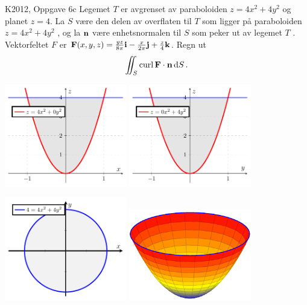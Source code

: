 \begin{frame}
  \begin{oppgave}{K2012, Oppgave 6c}
    Legemet $T$ er avgrenset av paraboloiden $z = 4x^2 +4y^2$ og planet $z = 4$.
    La $S$ være den delen av overflaten til $T$ som ligger på paraboloiden $z =
    4x^2 + 4y^2$ , og la $\mathbf{n}$ være enhetsnormalen til $S$ som peker ut av
    legemet $T$ . Vektorfeltet $F$ er
$
  \mathbf{F}(x, y, z) = \frac{yz}{8\pi}\mathbf{i} - \frac{x}{2\pi} \mathbf{j} + \frac{z}{4}\mathbf{k}
$. Regn ut
\begin{equation*}
  \iint_S \operatorname{curl} \mathbf{F} \cdot \mathbf{n} \mathop{}\! \mathrm{d} S\mathop{}\!.
\end{equation*}
\end{oppgave}
\end{frame}
\begin{frame}
\centerline{%
\includegraphics[width=0.4\textwidth]{../img/stokes-xz}%
\includegraphics[width=0.4\textwidth]{../img/stokes-yz}}
\centerline{%
\includegraphics[width=0.4\textwidth]{../img/stokes-xy}%
\includegraphics[width=0.4\textwidth]{../img/stokes-3d}}
\end{frame}


